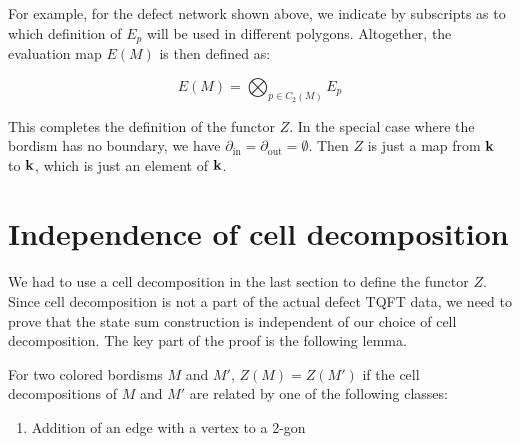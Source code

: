 \begin{defectfiguresetup}
For example, for the defect network shown above, we indicate by subscripts as to which definition of $E_p$ will be used in different polygons. Altogether, the evaluation map $E(M)$ is then defined as:

\begin{equation}
	E(M) = \bigotimes_{p \in C_2(M)} E_p
\end{equation}

This completes the definition of the functor $Z$. In the special case where the bordism has no boundary, we have $\partial_{\mathrm{in}} = \partial_{\mathrm{out}} = \emptyset$. Then $Z$ is just a map from $\mathbf{k}$ to $\mathbf{k}$, which is just an element of $\mathbf{k}$.

\section{Independence of cell decomposition}\label{s:decomposition-independence}
We had to use a cell decomposition in the last section to define the functor $Z$. Since cell decomposition is not a part of the actual defect TQFT data, we need to prove that the state sum construction is independent of our choice of cell decomposition. The key part of the proof is the following lemma.

\begin{lemma}\label{l:invariance-under-local-moves}
	For two colored bordisms $M$ and $M'$, $Z(M) = Z(M')$ if the cell decompositions of $M$ and $M'$ are related by one of the following classes:
	\begin{enumerate}
		\item Addition of an edge with a vertex to a 2-gon

		\newcommand{\twogonA}{%
			\vcenter{\hbox{%
					\begin{tikzpicture}[scale=0.20]
						\begin{pgfonlayer}{nodelayer}
							\node [0cell] (left) at (-4, 0) {};
							\node [0cell] (right) at (5, 0) {};
							\node [style=none] (bottom) at (0.25, -2.85) {};
							\node [style=none] (top) at (0.5, 2.85) {};
						\end{pgfonlayer}
						\begin{pgfonlayer}{edgelayer}
							\draw [1cell, bend left=60, looseness=1.25] (left.center) to (right.center);
							\draw [1cell, bend right=60, looseness=1.25] (left.center) to (right.center);
							\draw [midarrow=0.75, defect, bend right=15] (bottom.center) to (top.center);
						\end{pgfonlayer}
					\end{tikzpicture}%
			}}%
		}


\end{enumerate}
\end{lemma}
\end{defectfiguresetup}
